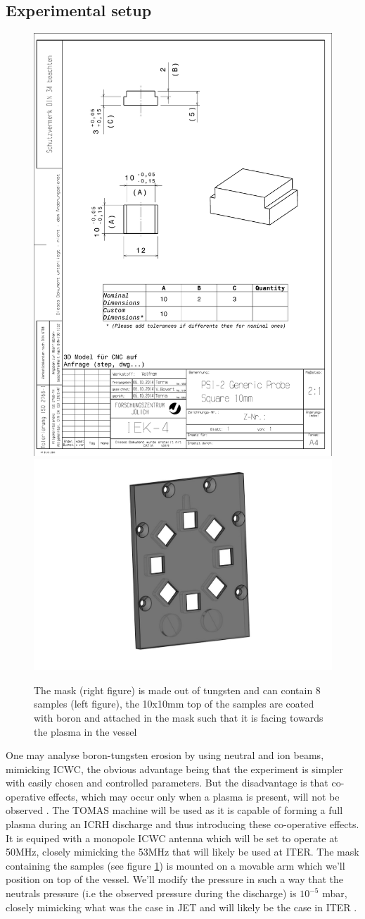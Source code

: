 \documentclass{article}
\begin{document}
\subsection{Experimental setup}
\begin{figure}[ht]
    \centering
    \includegraphics[height=0.33\textwidth]{figures/Sample.pdf}
    \includegraphics[height=0.33\textwidth]{figures/mask.pdf}
    \caption{The mask (right figure) is made out of tungsten and can contain 8 samples (left figure), 
    the 10x10mm top of the samples are coated with boron and attached in the mask such that it is facing towards    the plasma in the vessel}
    \label{fig:samples+mask}
\end{figure}
One may analyse boron-tungsten erosion by using neutral and ion beams,
mimicking ICWC, the obvious advantage being that the experiment is simpler with
easily chosen and controlled parameters.  But the disadvantage is that co-operative effects,
which may occur only when a plasma is present, will not be observed
\cite{McCRACKEN}. The TOMAS machine \cite{TOMAS} will be used as it is capable
of forming a full plasma during an ICRH discharge and thus introducing these
co-operative effects.  It is equiped with a monopole ICWC antenna which will be
set to operate at 50MHz, closely mimicking the 53MHz that will likely be used
at ITER.  The mask containing the samples (see figure \ref{fig:samples+mask})
is mounted on a movable arm which we'll position on top of the vessel.  
We'll modify the pressure in such a way that the
neutrals pressure (i.e the observed pressure during the discharge) is $10^{-5}$
mbar, closely mimicking what was the case in JET and will likely be the case in
ITER \cite{DOUAI}.
\end{document}
